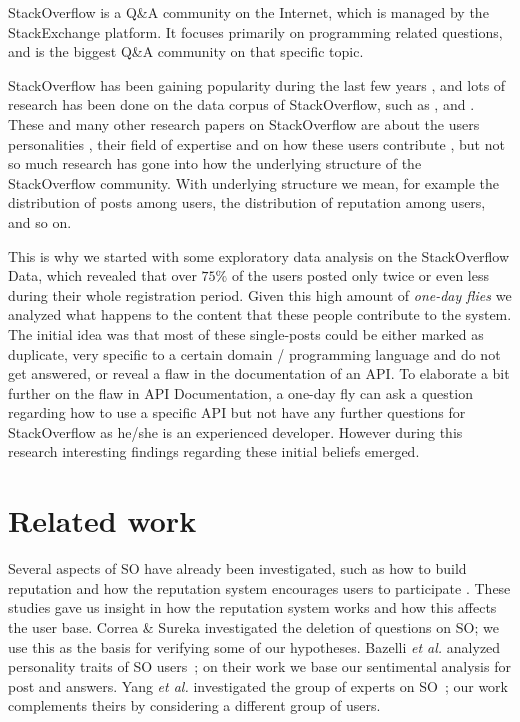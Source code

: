 \documentclass[conference]{IEEEtran}
\newcommand{\etal}{\emph{et al.}\xspace}
\begin{document}
StackOverflow is a Q\&A community on the Internet, which is managed by the
StackExchange platform. It focuses primarily on programming related questions,
and is the biggest Q\&A community on that specific topic.

StackOverflow has been gaining popularity during the last few years
\cite{anderson2012discovering}, and lots of research has been done on the data
corpus of StackOverflow, such as \cite{treude2011programmers},
\cite{barua2014developers} and \cite{morrison2013age}. These and many other
research papers on StackOverflow are about the users personalities
\cite{bosu2013building}, their field of expertise and on how these users
contribute \cite{movshovitz2013analysis}, but not so much research has gone
into how the underlying structure of the StackOverflow community. With
underlying structure we mean, for example the distribution of posts among
users, the distribution of reputation among users, and so on.

This is why we started with some exploratory data analysis on the StackOverflow
Data, which revealed that over $75\%$ of the users posted only twice or even
less during their whole registration period. Given this high amount of
\textit{one-day flies} we analyzed what happens to the content that these
people contribute to the system. The initial idea was that most of these
single-posts could be either marked as duplicate, very specific to a certain
domain / programming language and do not get answered, or reveal a flaw in the
documentation of an API. To elaborate a bit further on the flaw in API
Documentation, a one-day fly can ask a question regarding how to use a specific
API but not have any further questions for StackOverflow as he/she is an
experienced developer. However during this research interesting findings
regarding these initial beliefs emerged.


\section{Related work}

Several aspects of SO have already been investigated, such as how to
build reputation \cite{bosu2013building} and how the reputation system
encourages users to participate \cite{movshovitz2013analysis}. These studies 
gave us insight in how the reputation system works and how this affects the user
base. 
Correa \& Sureka \cite{correa2014chaff} investigated the deletion of
questions on SO; we use this as the basis for verifying some of our hypotheses.
Bazelli \etal analyzed personality traits of SO
users~\cite{bazelli2013personality}; on their work we base our sentimental
analysis for post and answers. 
Yang \etal investigated the group of experts on
SO~\cite{yang2014sparrows}; our work complements theirs by considering a
different group of users.
\end{document}

